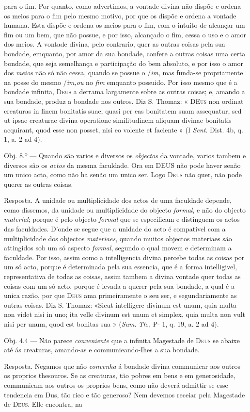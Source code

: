 para o fim. Por quanto, como advertimos, a vontade divina não dispõe e ordena os meios para o fim pelo mesmo motivo, por que os dispõe e ordena a vontade humana. Esta dispõe e ordena os meios para o fim, com o intuito de alcançar um fim ou um bem, que não possue, e por isso, alcançado o fim, cessa o uso e o amor dos meios. A vontade divina, pelo contrario, quer as outras coisas pela sua bondade, emquanto, por amor da sua bondade, confere a outras coisas uma certa bondade, que seja semelhança e participação do bem absoluto, e por isso o amor dos \emph{meios} não só não cessa, quando se possue o /\emph{im}, mas funda-se propriamente na posse do mesmo /\emph{im,ou} no \emph{fim} emquanto possuido. Por isso mesmo que é a bondade infinita, \textsc{Deus} a derrama largamente sobre as outras coisas; e, amando a sua bondade, produz a bondade nos outros. Diz S. Thomaz: « \textsc{DEus} non ordinat creaturas in finem bonitatis suae, quasi per eas bonitatem suam assequatur, sed ut ipsae creaturae divina operatione similitudinem aliquam divinae bonitatis acquirant, quod esse non posset, nisi eo volente et faciente » (I \emph{Sent}. Dist. 4b, q. 1, a. 2 ad 4).\par Obj. 8.º --- Quando são varios e diversos os \emph{objectos} da vontade, varios tambem e diversos são os \emph{actos} da mesma faculdade. Ora em \textsc{DEUS} não pode haver senão um unico acto, como não ha senão um unico ser. Logo \textsc{Deus} não quer, não pode querer as outras coisas.\par Resposta. A unidade ou multiplicidade dos actos de uma faculdade depende, como dissemos, da unidade ou multiplicidade do objecto \emph{formal}, e não do objecto \emph{material}; porque é pelo objecto \emph{formal} que se especificam e distinguem os actos das faculdades. D'onde se segue que a unidade do acto é compativel com a multiplicidade dos objectos \emph{materiaes}, quando muitos objectos materiaes são attingidos sob um só aspecto \emph{formal}, segundo o qual movem e determinam a faculdade. Por isso, assim como a intelligencia divina percebe todas as coisas por um só acto, porque é determinada pela sua essencia, que é a forma intelligivel, representativa de todas as coisas, assim tambem a divina vontade quer todas as coisas com um só acto, porque é levada a querer pela sua bondade, a qual é a unica razão, por que \textsc{Deus} ama primeiramente o seu ser, e segundariamente as outras coisas. Diz S. Thomaz: «Sicut intelligere divinum est unum, quia multa non videt nisi in uno; ita velle divinum est unum et simplex, quia multa non vult nisi per unum, quod est bonitas sua » (\emph{Sum}. \emph{Th}., P- 1, q. 19, a. 2 ad 4).\par Obj. 4.4 --- Não parece \emph{conveniente} que a infinita Magestade de \textsc{Deus} se abaixe até ás creaturas, amando-as e communieando-Ihes a sua bondade.\par Resposta. Negamos que não \emph{convenha} á bondade divina communicar aos outros os proprios thesouros. Se as creaturas, tão pobres em bens e em generosidade, communicam aos outros os proprios bens, como não deverá admittir-se esse tendencia em Dus, tão rico e tão generoso? Nem devemos receiar pela Magestade de \textsc{Deus}. Elle encontra, na 